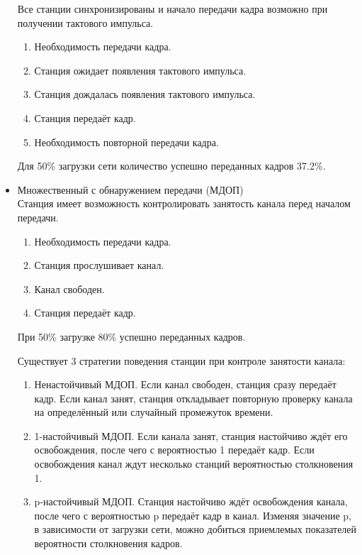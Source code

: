 \documentclass[12pt, russian, oneside, article]{ncc}
\begin{document}
\begin{itemize}
Все станции синхронизированы и начало передачи кадра возможно при получении тактового импульса.

\begin{enumerate}
\item Необходимость передачи кадра.
\item Станция ожидает появления тактового импульса.
\item Станция дождалась появления тактового импульса.
\item Станция передаёт кадр.
\item Необходимость повторной передачи кадра.
\end{enumerate}

Для 50\% загрузки сети количество успешно переданных кадров 37.2\%.


\item Множественный с обнаружением передачи (МДОП)\\
\label{sec-5_1_1_3}%
Станция имеет возможность контролировать занятость канала перед началом передачи.

\begin{enumerate}
\item Необходимость передачи кадра.
\item Станция прослушивает канал.
\item Канал свободен.
\item Станция передаёт кадр.
\end{enumerate}

При 50\% загрузке 80\% успешно переданных кадров.

Существует 3 стратегии поведения станции при контроле занятости канала:
\begin{enumerate}
\item Ненастойчивый МДОП. Если канал свободен, станция сразу передаёт кадр. Если канал занят, станция откладывает повторную проверку канала на определённый или случайный промежуток времени.
\item 1-настойчивый МДОП. Если канала занят, станция настойчиво ждёт его освобождения, после чего с вероятностью 1 передаёт кадр. Если освобождения канал ждут несколько станций вероятностью столкновения 1.
\item p-настойчивый МДОП. Станция настойчиво ждёт освобождения канала, после чего с вероятностью p передаёт кадр в канал. Изменяя значение p, в зависимости от загрузки сети, можно добиться приемлемых показателей вероятности столкновения кадров.
\end{enumerate}



\end{itemize}
\end{document}
